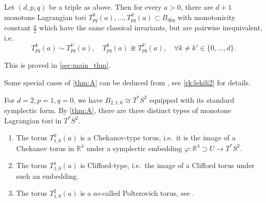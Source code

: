\documentclass[12pt,a4paper,abstract=true,final]{scrartcl}
\begin{document}
\begin{maintheorem}
    \label{thm:A}
    Let $(d,p,q)$ be a triple as above.
Then for every $a>0$, there are $d+1$ monotone Lagrangian tori $T^0_{pq}(a), \ldots , T^d_{pq}(a) \subset B_{dpq}$ with monotonicity constant $\frac{a}{2}$ which have the same classical invariants, but are pairwise inequivalent, i.e.\ 
    \begin{equation}
        T^k_{pq}(a) \sim T^{k'}_{pq}(a), \quad 
         T^k_{pq}(a) \ncong T^{k'}_{pq}(a), \quad
        \forall k \neq k' \in \{0,\ldots,d\}.
    \end{equation}
\end{maintheorem}

This is proved in \cref{sec:main_thm}.

\begin{remark}
    \label{rk:lekili}
    Some special cases of \cref{thm:A} can be deduced from \cite{LekMay14}, see \cref{rk:lekili2} for details.
\end{remark}

\begin{example}
    \label{ex:cotangent}
    For $d=2, p=1, q=0$, we have $B_{2,1,0} \cong T^*S^2$ equipped with its standard symplectic form.
By \cref{thm:A}, there are three distinct types of monotone Lagrangian tori in $T^*S^2$. 
    \begin{enumerate}
        \item The torus $T^0_{1,0}(a)$ is a Chekanov-type torus, i.e.\ it is the image of a Chekanov torus in $\mathbb{R}^4$ under a symplectic embedding $\varphi \colon \mathbb{R}^4 \supset U \rightarrow T^*S^2$.
        \item The torus $T^1_{1,0}(a)$ is Clifford-type, i.e.\ the image of a Clifford torus under such an embedding.
        \item The torus $T^2_{1,0}(a)$ is a so-called Polterovich torus, see \cite{AlbFra08}. 
    \end{enumerate} 
\end{example}
\end{document}
